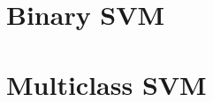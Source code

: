 \documentclass[12pt]{article}
\begin{document}
\clearpage

\section{Binary SVM}

\section{Multiclass SVM}
\end{document}
